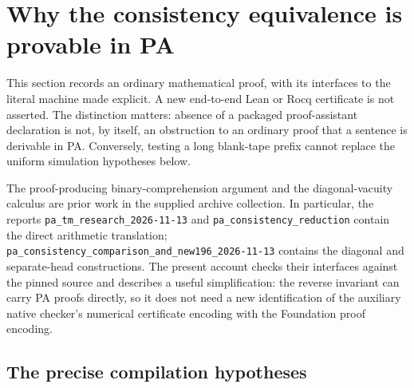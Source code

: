 \section{Why the consistency equivalence is provable in PA}
\label{sec:pa-bridge-audit}

This section records an ordinary mathematical proof, with its interfaces to
the literal machine made explicit.  A new end-to-end Lean or Rocq certificate
is not asserted.  The distinction matters: absence of a packaged proof-assistant
declaration is not, by itself, an obstruction to an ordinary proof that a
sentence is derivable in PA.  Conversely, testing a long blank-tape prefix
cannot replace the uniform simulation hypotheses below.

The proof-producing binary-comprehension argument and the diagonal-vacuity
calculus are prior work in the supplied archive collection.  In particular,
the reports \texttt{pa\_tm\_research\_2026-11-13} and
\texttt{pa\_consistency\_reduction} contain the direct arithmetic translation;
\texttt{pa\_consistency\_comparison\_and\_new196\_2026-11-13} contains the
diagonal and separate-head constructions.  The present account checks their
interfaces against the pinned source and describes a useful simplification:
the reverse invariant can carry PA proofs directly, so it does not need a
new identification of the auxiliary native checker's numerical certificate
encoding with the Foundation proof encoding.

\subsection{The precise compilation hypotheses}

